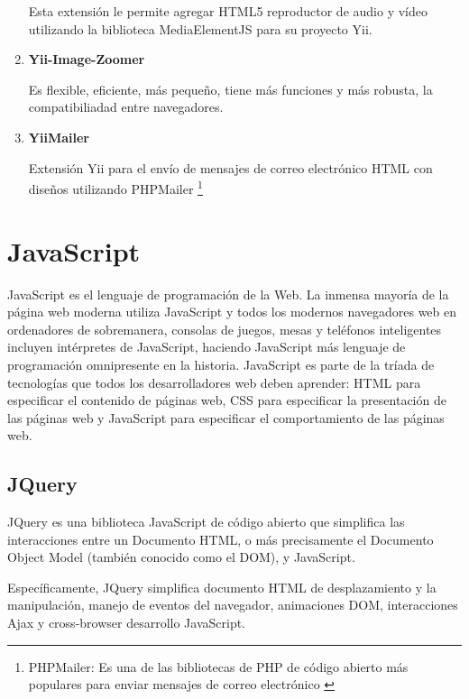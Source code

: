 \begin{enumerate}
Esta extensi\'{o}n le permite agregar HTML5 reproductor de audio y v\'{i}deo 
utilizando la biblioteca MediaElementJS para su proyecto Yii. \cite{mediaelement}

\item \textbf{Yii-Image-Zoomer}

Es flexible, eficiente, m\'{a}s peque\~{n}o, tiene m\'{a}s funciones y m\'{a}s
robusta, la compatibiliadad entre navegadores. \cite{yiiImageZoomer}

\item \textbf{YiiMailer}

Extensi\'{o}n Yii para el env\'{i}o de mensajes de correo electr\'{o}nico HTML
con dise\~{n}os utilizando PHPMailer \footnote{PHPMailer: Es una de las 
bibliotecas de PHP de c\'{o}digo abierto m\'{a}s populares para enviar mensajes
de correo electr\'{o}nico \cite{phpMailer}} \cite{yiiMailer}

\end{enumerate}


\section{JavaScript} 

JavaScript es el lenguaje de programaci\'{o}n de la Web. La inmensa mayor\'{i}a
de la p\'{a}gina web moderna utiliza JavaScript y todos los modernos navegadores
web en ordenadores de sobremanera, consolas de juegos, mesas y tel\'{e}fonos 
inteligentes incluyen int\'{e}rpretes de JavaScript, haciendo JavaScript m\'{a}s
lenguaje de programaci\'{o}n  omnipresente en la historia. JavaScript es parte de
la tr\'{i}ada de tecnolog\'{i}as que todos los desarrolladores web deben aprender:
HTML para especificar el contenido de p\'{a}ginas web, CSS para especificar la 
presentaci\'{o}n de las p\'{a}ginas web y JavaScript para especificar el comportamiento
de las p\'{a}ginas web. \cite{flanagan2006javascript}

\subsection{JQuery}

JQuery es una biblioteca JavaScript de c\'{o}digo abierto que simplifica las 
interacciones entre un Documento HTML, o m\'{a}s precisamente el Documento 
Object Model (tambi\'{e}n conocido como el DOM), y JavaScript.

Espec\'{i}ficamente, JQuery simplifica documento HTML de desplazamiento y la 
manipulaci\'{o}n, manejo de eventos del navegador, animaciones DOM, interacciones
Ajax y cross-browser desarrollo JavaScript.\cite{lindley2009jquery}

